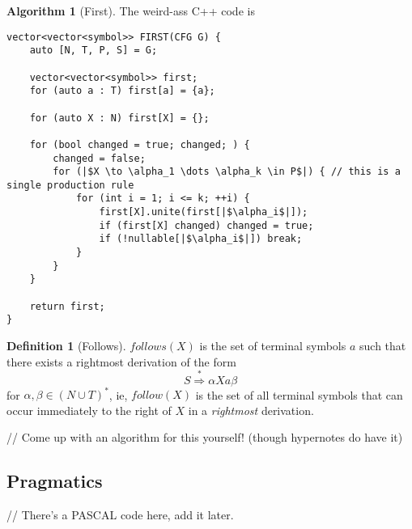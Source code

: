 \documentclass[a4paper]{scrartcl}
\theoremstyle{definition}
\newtheorem{definition}{Definition}
\newtheorem{algorithm}{Algorithm}
\newcommand{\derives}{\stackrel{*}{\Rightarrow}}
\begin{document}
\begin{algorithm}[First]
	The weird-ass C++ code is
\begin{verbatim}
vector<vector<symbol>> FIRST(CFG G) {
	auto [N, T, P, S] = G;

	vector<vector<symbol>> first;
	for (auto a : T) first[a] = {a};

	for (auto X : N) first[X] = {};

	for (bool changed = true; changed; ) {
		changed = false;
		for (|$X \to \alpha_1 \dots \alpha_k \in P$|) { // this is a single production rule
			for (int i = 1; i <= k; ++i) {
				first[X].unite(first[|$\alpha_i$|]);
				if (first[X] changed) changed = true;
				if (!nullable[|$\alpha_i$|]) break;
			}
		}
	}

	return first;
}
\end{verbatim}
\end{algorithm}

\begin{definition}[Follows]
	$follows(X)$ is the set of terminal symbols $a$ such that there exists a rightmost derivation of the form
	\[S \derives \alpha X a \beta\]
	for $\alpha, \beta \in (N \cup T)^*$, ie, $follow(X)$ is the set of all terminal symbols that can occur immediately to the right of $X$ in a \emph{rightmost} derivation.
\end{definition}
// Come up with an algorithm for this yourself! (though hypernotes do have it)


\subsection{Pragmatics}
// There's a PASCAL code here, add it later.
\end{document}
